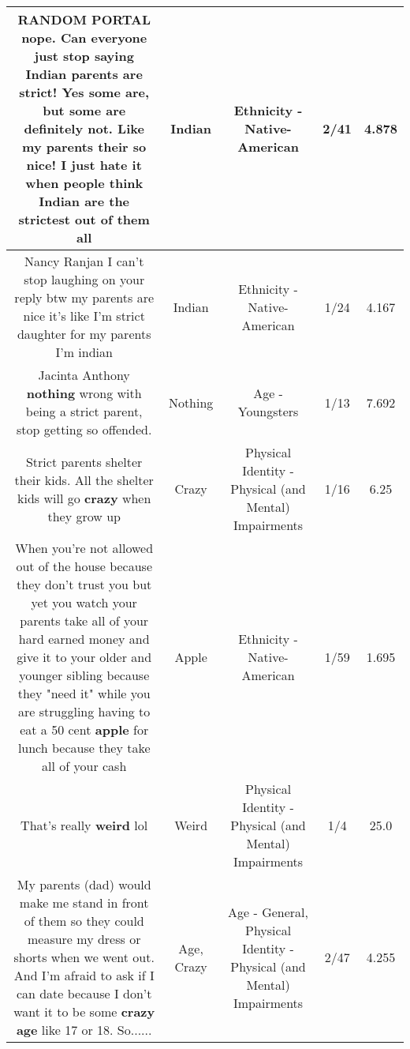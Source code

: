 \documentclass[11pt]{article}
\newlength\mylength
\begin{document}
\begin{center}
\begin{longtable}{|C{.65\mylength}|C{.30\mylength}|C{.12\mylength}|C{.12\mylength}|C{.12\mylength}|}
  \small RANDOM PORTAL nope. Can everyone just stop saying \textbf{Indian} parents are strict! Yes some are, but some are definitely not. Like my parents their so nice! I just hate it when people think \textbf{Indian} are the strictest out of them all\normalsize   & Indian & Ethnicity - Native-American & 2/41 & 4.878 \\  \hline
  \small Nancy Ranjan I can't stop  laughing on your reply btw  my parents are nice it's like I'm strict daughter for my parents I'm indian\normalsize   & Indian & Ethnicity - Native-American & 1/24 & 4.167 \\  \hline
  \small Jacinta Anthony \textbf{nothing} wrong with being a strict parent, stop getting so offended.\normalsize   & Nothing & Age - Youngsters & 1/13 & 7.692 \\  \hline
  \small Strict parents shelter their kids. All the shelter kids will go \textbf{crazy} when they grow up\normalsize   & Crazy & Physical Identity - Physical (and Mental) Impairments & 1/16 & 6.25 \\  \hline
  \small When you're not allowed out of the house because they don't trust you but yet you watch your parents take all of your hard earned money and give it to your older and younger sibling because they "need it" while you are struggling having to eat a 50 cent \textbf{apple} for lunch because they take all of your cash\normalsize   & Apple & Ethnicity - Native-American & 1/59 & 1.695 \\  \hline
  \small That's really \textbf{weird} lol\normalsize   & Weird & Physical Identity - Physical (and Mental) Impairments & 1/4 & 25.0 \\  \hline
  \small My parents (dad) would make me stand in front of them so they could measure my dress or shorts when we went out. And I'm afraid to ask if I can date because I don't want it to be some \textbf{crazy} \textbf{age} like 17 or 18. So......\normalsize   & Age, Crazy & Age - General, Physical Identity - Physical (and Mental) Impairments & 2/47 & 4.255 \\  \hline

\end{longtable}
\end{center}
\end{document}
